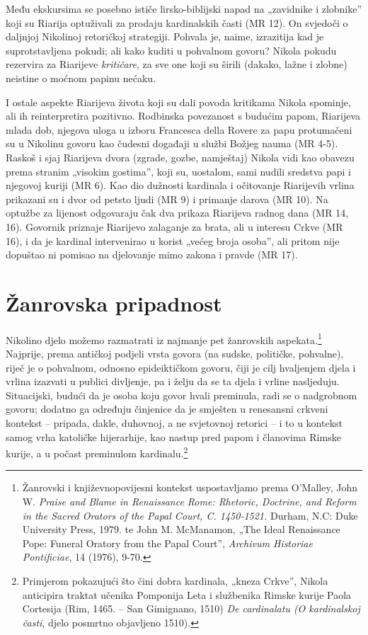 \documentclass[a5paper,twoside]{article}
\begin{document}
Među ekskursima se posebno ističe lirsko-biblijski napad na „zavidnike i zlobnike” koji su Riarija optuživali za prodaju kardinalskih časti (MR 12). On svjedoči o daljnjoj Nikolinoj retoričkoj strategiji. Pohvala je, naime, izrazitija kad je suprotstavljena pokudi; ali kako kuditi u pohvalnom govoru? Nikola pokudu rezervira za Riarijeve \textit{kritičare}, za sve one koji su širili (dakako, lažne i zlobne) neistine o moćnom papinu nećaku.

I ostale aspekte Riarijeva života koji su dali povoda kritikama Nikola spominje, ali ih reinterpretira pozitivno. Rodbinska povezanost s budućim papom, Riarijeva mlada dob, njegova uloga u izboru Francesca della Rovere za papu protumačeni su u Nikolinu govoru kao čudesni događaji u službi Božjeg nauma (MR 4-5). Raskoš i sjaj Riarijeva dvora (zgrade, gozbe, namještaj) Nikola vidi kao obavezu prema stranim „visokim gostima”, koji su, uostalom, sami nudili sredstva papi i njegovoj kuriji (MR 6). Kao dio dužnosti kardinala i očitovanje Riarijevih vrlina prikazani su i dvor od petsto ljudi (MR 9) i primanje darova (MR 10). Na optužbe za lijenost odgovaraju čak dva prikaza Riarijeva radnog dana (MR 14, 16).  Govornik priznaje Riarijevo zalaganje za brata, ali u interesu Crkve (MR 16), i da je kardinal intervenirao u korist „većeg broja osoba”, ali pritom nije dopuštao ni pomisao na djelovanje mimo zakona i pravde (MR 17).


\section{Žanrovska pripadnost}

Nikolino djelo možemo razmatrati iz najmanje pet žanrovskih aspekata.\footnote{Žanrovski i književnopovijesni kontekst uspostavljamo prema O'Malley, John W. \textit{Praise and Blame in Renaissance Rome: Rhetoric, Doctrine, and Reform in the Sacred Orators of the Papal Court, C. 1450-1521.} Durham, N.C: Duke University Press, 1979. te John M. McManamon, „The Ideal Renaissance Pope: Funeral Oratory from the Papal Court”, \textit{Archivum Historiae Pontificiae}, 14 (1976), 9-70.} Najprije, prema antičkoj podjeli vrsta govora (na sudske, političke, pohvalne), riječ je o pohvalnom, odnosno epideiktičkom govoru, čiji je cilj hvaljenjem djela i vrlina izazvati u publici divljenje, pa i želju da se ta djela i vrline nasljeduju. Situacijski, budući da je osoba koju govor hvali preminula, radi se o nadgrobnom govoru; dodatno ga određuju činjenice da je smješten u renesansni crkveni kontekst – pripada, dakle, duhovnoj, a ne svjetovnoj retorici – i to u kontekst samog vrha katoličke hijerarhije, kao nastup pred papom i članovima Rimske kurije, a u počast preminulom kardinalu.\footnote{Primjerom pokazujući što čini dobra kardinala, „kneza Crkve”, Nikola anticipira traktat učenika Pomponija Leta i službenika Rimske kurije Paola Cortesija (Rim, 1465. – San Gimignano, 1510) \textit{De cardinalatu (O kardinalskoj časti}, djelo posmrtno objavljeno 1510).}
\end{document}
